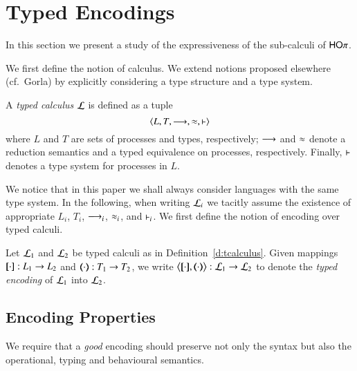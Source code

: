 
\newpage
\section{Typed Encodings}

In this section we present a study of the expressiveness 
of the sub-calculi of $\mathsf{HO}\pi$.

We first define the notion of calculus.
We extend notions proposed elsewhere (cf.~Gorla) by explicitly
considering a type structure and a type system.

\begin{definition}\label{d:tcalculus}
	A \emph{typed calculus} $\mathcal{L}$ is defined as a tuple $$\langle L, T, \longrightarrow, \approx, \vdash \rangle$$
	where $L$ and $T$ are sets of processes and types, respectively; %
	$\longrightarrow$ and $\approx$ denote a reduction semantics 
	and a typed equivalence
	on processes, respectively. Finally, $\vdash$ denotes a type system for processes in $L$.
\end{definition}

We notice that in this paper we shall always consider languages with the same type system.
In the following, when writing $\mathcal{L}_i$ we tacitly assume the existence of appropriate 
$L_i$, $T_i$, $\longrightarrow_i$, $\approx_i$, and $\vdash_i$.
We first define the notion of encoding over typed calculi.

\begin{definition}
	Let  $\mathcal{L}_1$ %
	and $\mathcal{L}_2$ %
	be typed calculi as in Definition~\ref{d:tcalculus}.
	Given mappings $[\!\![\cdot]\!\!]: L_1 \to L_2$ and
	$(\!\!\langle\cdot\rangle\!\!): T_1 \to T_2$, 
	we write 
	$\enc{\cdot}{\cdot} : \tyl{L}_1 \to \tyl{L}_2$ to denote the \emph{typed encoding} of $\mathcal{L}_1$ into $\mathcal{L}_2$.

\end{definition}

\subsection{Encoding Properties}

We require that a {\em good} encoding should 
preserve not only the syntax but
also the operational, typing and behavioural
semantics. 

